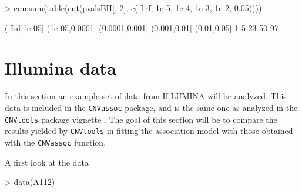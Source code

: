 \documentclass[11pt]{article}
\begin{document}
\begin{Schunk}
\begin{Sinput}
> cumsum(table(cut(pvalsBH[, 2], c(-Inf, 1e-5, 1e-4, 1e-3, 1e-2, 0.05))))
\end{Sinput}
\begin{Soutput}
  (-Inf,1e-05] (1e-05,0.0001] (0.0001,0.001]   (0.001,0.01]    (0.01,0.05] 
             1              5             23             50             97 
\end{Soutput}
\end{Schunk}
%



\section{Illumina data}


In this section an example set of data from ILLUMINA will be analyzed. 
This data is included in the \texttt{CNVassoc} package, and is the same one as analyzed in the \texttt{CNVtools} package vignette 
\cite{CNVtools-vignette}. The goal of this section will be to compare the results yielded by \texttt{CNVtools} in fitting the association model
with those obtained with the \texttt{CNVassoc} function.



A first look at the data
\begin{Schunk}
\begin{Sinput}
> data(A112)
\end{Sinput}
\end{Schunk}
\end{document}
